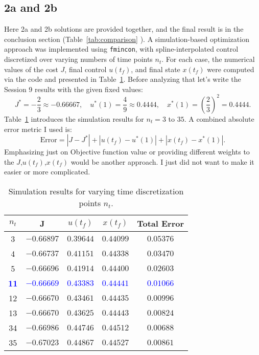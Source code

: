 \documentclass{article}
\begin{document}
\subsection*{2a and 2b}
Here 2a and 2b solutions are provided together, and the final result is in the conclusion section (Table~\ref{tab:comparison} ). A simulation-based optimization approach was implemented using \texttt{fmincon}, with spline-interpolated control discretized over varying numbers of time points \(n_t\). For each case, the numerical values of the cost \(J\), final control \(u(t_f)\), and final state \(x(t_f)\) were computed via the code and presented in Table~\ref{tab:problem2}. Before analyzing that let's write the Session 9 results with the given fixed values:
\[
J^* = -\frac{2}{3} \approx -0.66667, \quad u^*(1) = \frac{4}{9} \approx 0.4444, \quad x^*(1) = \left(\frac{2}{3}\right)^2 = 0.4444.
\]
Table~\ref{tab:problem2} introduces the simulation results for \(n_t = 3\) to \(35\). A combined absolute error metric I used is:
\[
\text{Error} = |J - J^*| + |u(t_f) - u^*(1)| + |x(t_f) - x^*(1)|.
\]
Emphasizing just on Objective function value or providing different weights to the \(J\),\(u(t_f)\),\(x(t_f)\) would be another approach. I just did not want to make it easier or more complicated.
\begin{table}[H]
\centering
\caption{Simulation results for varying time discretization points \(n_t\).}
\label{tab:problem2}
\begin{tabular}{|c|c|c|c|c|}
\hline
\textbf{$n_t$} & \textbf{J} & \textbf{$u(t_f)$} & \textbf{$x(t_f)$} & \textbf{Total Error} \\
\hline
3  & $-0.66897$ & $0.39644$ & $0.44099$ & $0.05376$ \\
4  & $-0.66737$ & $0.41151$ & $0.44338$ & $0.03470$ \\
5  & $-0.66696$ & $0.41914$ & $0.44400$ & $0.02603$ \\
\hline
\textbf{\textcolor{blue}{11}} & \textbf{\textcolor{blue}{$-0.66669$}} & \textbf{\textcolor{blue}{$0.43383$}} & \textbf{\textcolor{blue}{$0.44441$}} & \textbf{\textcolor{blue}{$0.01066$}} \\
12 & $-0.66670$ & $0.43461$ & $0.44435$ & $0.00996$ \\
13 & $-0.66670$ & $0.43625$ & $0.44443$ & $0.00824$ \\
\hline
34 & $-0.66986$ & $0.44746$ & $0.44512$ & $0.00688$ \\
35 & $-0.67023$ & $0.44867$ & $0.44527$ & $0.00861$ \\
\hline
\end{tabular}
\end{table}
\end{document}
